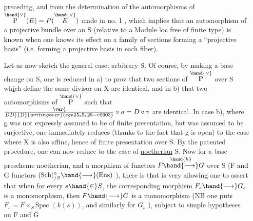 
preceding, and from the determination of the automorphisms of $\overset{\hand{\vee}}{\mathrm{P}}(E) = P(\overset{\hand{\vee}}{E})$ made
in no. 1 , which implies that an automorphism of a projective bundle over an S
(relative to a Module loc free of finite type) is known when one knows
its effect on a family of sections forming a ``projective basis''
(i.e. forming a projective basis in each  fiber).

Let us now sketch the general case: arbitrary S. Of course,
by making a base change on S, one is reduced in a) to prov
that two sections of $\overset{\hand{\vee}}{\mathrm{P}}$ over S wh\uline{i}ch define the same divisor on X are
identical, and in b) that two automorphisms of $\overset{\hand{\vee}}{\mathrm{P}}$ such that
$\var{\over{D}{D}}{D}{writing over}{ega25_25_129-v0003}\circ u = D\circ v$ are identical.  In case b), where g was not expressly assumed
to be of finite presentation, but was assumed to be surjective, one immediately reduces
(thanks to the fact that g is open) to the case where X is also affine, hence
of finite presentation over S. By the patented procedure, one can now
reduce to the case of \uline{noetherian} S. Now for a base prescheme  noetherian,
and a morphism of functors $F \overset{\hand{h}}{\hand{\longrightarrow}} G$ over S (F and G functors
$(\mathrm{Sch})_{/S}^{\circ} \hand{\longrightarrow} (\mathrm{Ens})$ ), there is   that is very   allowing one to assert
that when for every $s \hand{\in} S$, the corresponding morphism $F_s \hand{\longrightarrow} G_s$ is
a monomorphism, then $F \hand{\longrightarrow} G$ is a monomorphism (NB one puts $F_s{=}F\times_S\mathrm{Spec}$
$(k(s))$, and similarly for $G_s$ ), subject to simple hypotheses on F and G

